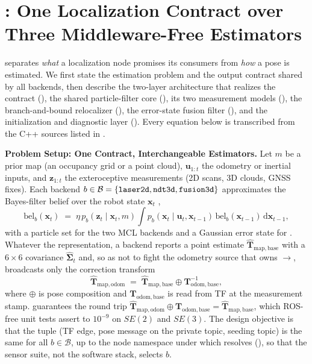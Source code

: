 \section{\sname: One Localization Contract over Three Middleware-Free Estimators}\label{sec:method}

\sname{} separates \emph{what} a localization node promises its consumers from \emph{how} a pose is estimated. We first state the estimation problem and the output contract shared by all backends, then describe the two-layer architecture that realizes the contract (), the shared particle-filter core (), its two measurement models (), the branch-and-bound relocalizer (), the error-state fusion filter (), and the initialization and diagnostic layer (). Every equation below is transcribed from the C++ sources listed in .

\noindent\textbf{Problem Setup: One Contract, Interchangeable Estimators.}
Let $m$ be a prior map (an occupancy grid or a point cloud), $\mathbf{u}_{1:t}$ the odometry or inertial inputs, and $\mathbf{z}_{1:t}$ the exteroceptive measurements (2D scans, 3D clouds, GNSS fixes). Each backend $b\in\mathcal{B}=\{\texttt{laser2d},\texttt{ndt3d},\texttt{fusion3d}\}$ approximates the Bayes-filter belief over the robot state $\mathbf{x}_t$ \citep{thrun2005probabilistic},
\begin{equation}\label{eq:bayes}
  \mathrm{bel}_b(\mathbf{x}_t) \;=\; \eta\, p_b(\mathbf{z}_t \mid \mathbf{x}_t, m) \int p_b(\mathbf{x}_t \mid \mathbf{u}_t, \mathbf{x}_{t-1})\, \mathrm{bel}_b(\mathbf{x}_{t-1})\, \mathrm{d}\mathbf{x}_{t-1},
\end{equation}
with a particle set for the two MCL backends and a Gaussian error state for . Whatever the representation, a backend reports a point estimate $\hat{\mathbf{T}}_{\mathrm{map,base}}$ with a $6\times6$ covariance $\hat{\boldsymbol{\Sigma}}_t$ and, so as not to fight the odometry source that owns $\to$, broadcasts only the correction transform
\begin{equation}\label{eq:mapodom}
  \hat{\mathbf{T}}_{\mathrm{map,odom}} \;=\; \hat{\mathbf{T}}_{\mathrm{map,base}} \oplus \mathbf{T}_{\mathrm{odom,base}}^{-1},
\end{equation}
where $\oplus$ is pose composition and $\mathbf{T}_{\mathrm{odom,base}}$ is read from TF at the measurement stamp.  guarantees the round trip $\hat{\mathbf{T}}_{\mathrm{map,odom}}\oplus\mathbf{T}_{\mathrm{odom,base}}=\hat{\mathbf{T}}_{\mathrm{map,base}}$, which ROS-free unit tests assert to $10^{-9}$ on $SE(2)$ and $SE(3)$. The design objective is that the tuple (TF edge, pose message on the private  topic, seeding topic) is the same for all $b\in\mathcal{B}$, up to the node namespace under which  resolves (), so that the sensor suite, not the software stack, selects $b$.

